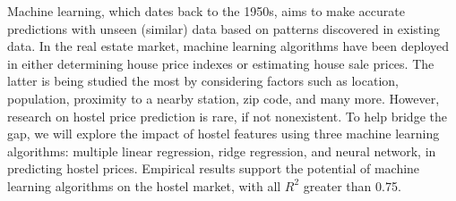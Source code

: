 \begin{sloppypar}
	
Machine learning, which dates back to the 1950s, aims to make accurate predictions with unseen (similar) data based on patterns discovered in existing data. In the real estate market, machine learning algorithms have been deployed in either determining house price indexes or estimating house sale prices. The latter is being studied the most by considering factors such as location, population, proximity to a nearby station, zip code, and many more. However, research on hostel price prediction is rare, if not nonexistent. To help bridge the gap, we will explore the impact of hostel features using three machine learning algorithms: multiple linear regression, ridge regression, and neural network, in predicting hostel prices. Empirical results support the potential of machine learning algorithms on the hostel market, with all $R^2 $ greater than 0.75.

\end{sloppypar}
